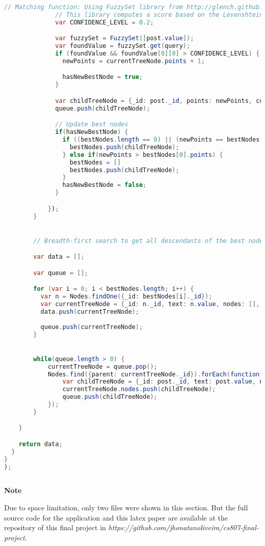 \begin{lstlisting}[language=java]
              // Matching function: Using FuzzySet library from http://glench.github.io/fuzzyset.js/
              // This library computes a score based on the Levenshtein distance
              var CONFIDENCE_LEVEL = 0.2;

              var fuzzySet = FuzzySet([post.value]);
              var foundValue = fuzzySet.get(query);
              if (foundValue && foundValue[0][0] > CONFIDENCE_LEVEL) {
                newPoints = currentTreeNode.points + 1;

                hasNewBestNode = true;
              }

              var childTreeNode = {_id: post._id, points: newPoints, confidence: foundValue ? foundValue[0][0] : 0};
              queue.push(childTreeNode);

              // Update best nodes
              if(hasNewBestNode) {
                if ((bestNodes.length == 0) || (newPoints == bestNodes[0].points)) {
                  bestNodes.push(childTreeNode);
                } else if(newPoints > bestNodes[0].points) {
                  bestNodes = []
                  bestNodes.push(childTreeNode);
                }
                hasNewBestNode = false;
              }

            });
        }


        // Breadth-first search to get all descendants of the best nodes

        var data = [];

        var queue = [];

        for (var i = 0; i < bestNodes.length; i++) {
          var n = Nodes.findOne({_id: bestNodes[i]._id});
          var currentTreeNode = {_id: n._id, text: n.value, nodes: [], confidence: bestNodes[i].confidence};
          data.push(currentTreeNode);
          
          queue.push(currentTreeNode);
        }


        while(queue.length > 0) {
            currentTreeNode = queue.pop();
            Nodes.find({parent: currentTreeNode._id}).forEach(function(post){
                var childTreeNode = {_id: post._id, text: post.value, nodes: []};
                currentTreeNode.nodes.push(childTreeNode);
                queue.push(childTreeNode);
            });
        }

    }

    return data;
  }
}
);
    
\end{lstlisting}


\bf{Note}

Due to space limitation, only two files were shown in this section.
But the full source code for the application and this latex paper are available at the repository of this final project in \emph{https://github.com/jhonatanoliveira/cs807-final-project}.
